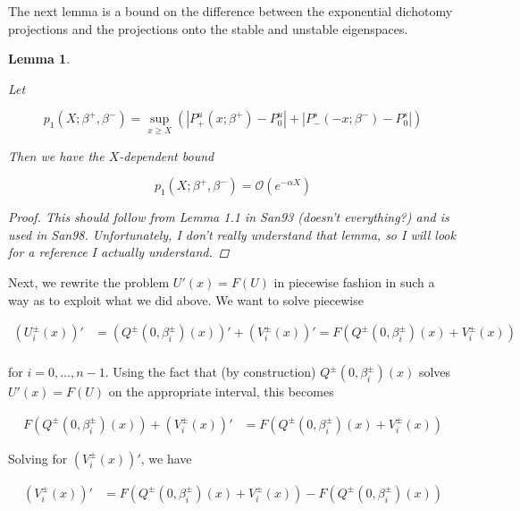 \documentclass[12pt]{article}
\newtheorem{lemma}{Lemma}
\begin{document}
The next lemma is a bound on the difference between the exponential dichotomy projections and the projections onto the stable and unstable eigenspaces.


\begin{lemma}\label{p1}

Let 

\begin{equation}
p_1(X; \beta^+, \beta^-) = \sup_{x \geq X} (|P^u_+(x; \beta^+) - P_0^u| + |P^s_-(-x; \beta^-) - P_0^s|)
\end{equation}

Then we have the $X$-dependent bound

\begin{equation}
p_1(X; \beta^+, \beta^-) = \mathcal{O}(e^{-\alpha X})
\end{equation} 

\begin{proof}
This should follow from Lemma 1.1 in San93 (doesn't everything?) and is used in San98. Unfortunately, I don't really understand that lemma, so I will look for a reference I actually understand.
\end{proof}
\end{lemma}


Next, we rewrite the problem $U'(x) = F(U)$ in piecewise fashion in such a way as to exploit what we did above. We want to solve piecewise

\begin{align*}
(U_i^\pm(x))' &= (Q^\pm(0, \beta_i^\pm)(x))' + (V_i^\pm(x))' = F\left(Q^\pm(0, \beta_i^\pm)(x) + V_i^\pm(x) \right) \\
\end{align*}

for $i = 0, \dots, n-1$. Using the fact that (by construction) $Q^\pm(0, \beta_i^\pm)(x)$ solves $U'(x) = F(U)$ on the appropriate interval, this becomes

\begin{align*}
F(Q^\pm(0, \beta_i^\pm)(x)) + (V_i^\pm(x))' &= F(Q^\pm(0, \beta_i^\pm)(x) + V_i^\pm(x) )
\end{align*}

Solving for $(V_i^\pm(x))'$, we have

\begin{align*}
(V_i^\pm(x))' &= F(Q^\pm(0, \beta_i^\pm)(x) + V_i^\pm(x) ) - F(Q^\pm(0, \beta_i^\pm)(x) )
\end{align*}
\end{document}
